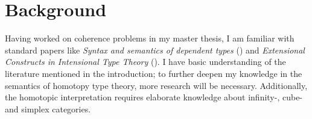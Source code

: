 \documentclass{article}
\begin{document}
\section{Background}
Having worked on coherence problems in my master thesis, I am familiar with standard papers like \emph{Syntax and semantics of dependent types} (\cite{hofmann97}) and \emph{Extensional Constructs in Intensional Type Theory} (\cite{hofmann-extensional}).
I have basic understanding of the literature mentioned in the introduction; to further deepen my knowledge in the semantics of homotopy type theory, more research will be necessary. 
Additionally, the homotopic interpretation requires elaborate knowledge about infinity-, cube- and simplex categories.
\end{document}
